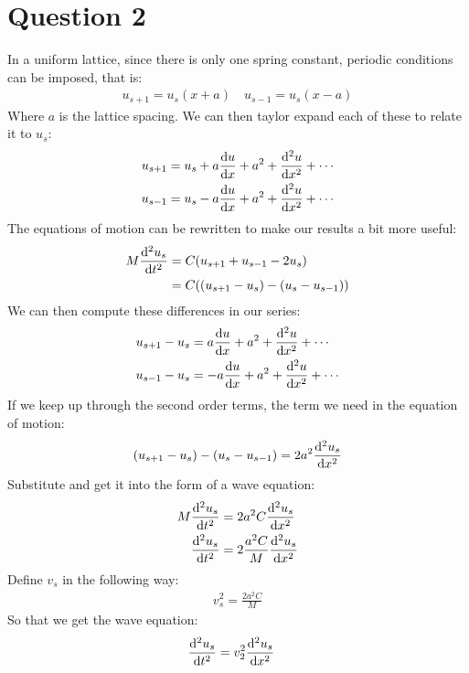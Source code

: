 \documentclass[12pt]{article}
\begin{document}
\section*{Question 2}
In a uniform lattice, since there is only one spring constant, periodic conditions can be imposed, that is:
\begin{align*}
  u_{s+1}=u_s(x+a)\quad u_{s-1}=u_s(x-a)
\end{align*}
Where $a$ is the lattice spacing. We can then taylor expand each of these to relate it to $u_s$:
\begin{align*}
  u_{s+1}&=u_s+a\dv{u}{x}+a^2+\dv[2]{u}{x}+\cdots\\
  u_{s-1}&=u_s-a\dv{u}{x}+a^2+\dv[2]{u}{x}+\cdots
\end{align*}
The equations of motion can be rewritten to make our results a bit more useful:
\begin{align*}
  M\dv[2]{u_s}{t}&=C\qty(u_{s+1}+u_{s-1}-2u_s)\\
  &=C\qty((u_{s+1}- u_s) - (u_{s}-u_{s-1}))
\end{align*}
We can then compute these differences in our series:
\begin{align*}
  u_{s+1}-u_s&=a\dv{u}{x}+a^2+\dv[2]{u}{x}+\cdots\\
  u_{s-1}-u_s&=-a\dv{u}{x}+a^2+\dv[2]{u}{x}+\cdots
\end{align*}
If we keep up through the second order terms, the term we need in the equation of motion:
\begin{align*}
  (u_{s+1}- u_s) - (u_{s}-u_{s-1})=2a^2\dv[2]{u_s}{x}
\end{align*}
Substitute and get it into the form of a wave equation:
\begin{align*}
  M\dv[2]{u_s}{t}&=2a^2C\dv[2]{u_s}{x}\\
  \dv[2]{u_s}{t}&=2\frac{a^2C}{M}\dv[2]{u_s}{x}
\end{align*}
Define $v_s$ in the following way:
\begin{align*}
  v_s^2=\frac{2a^2C}{M}
\end{align*}
So that we get the wave equation:
\begin{align*}
  \dv[2]{u_s}{t}&=v_2^2\dv[2]{u_s}{x}
\end{align*}
\end{document}
